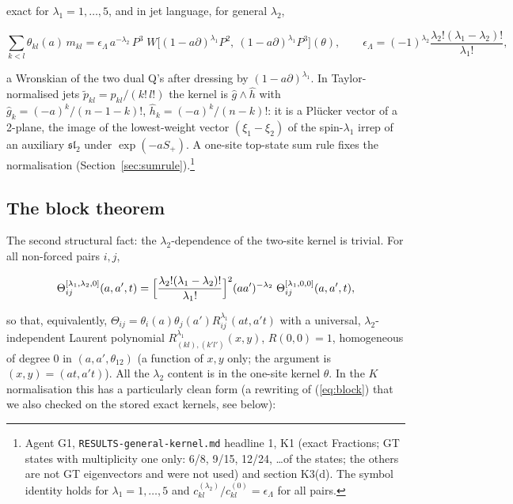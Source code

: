 \documentclass[11pt]{article}
\begin{document}
exact for $\lambda_1=1,\dots,5$, and in jet language, for general $\lambda_2$,

\begin{equation}
\sum_{k<l}\theta_{kl}(a)\,m_{kl}=\epsilon_\Lambda\,a^{-\lambda_2}\,P^3\;W\bigl[(1-a\partial)^{\lambda_1}P^2,\ (1-a\partial)^{\lambda_1}P^3\bigr](\theta),\qquad \epsilon_\Lambda=(-1)^{\lambda_2}\frac{\lambda_2!(\lambda_1-\lambda_2)!}{\lambda_1!},\label{eq:dressedW}
\end{equation}

a Wronskian of the two dual Q's after dressing by $(1-a\partial)^{\lambda_1}$. In Taylor-normalised jets $\tilde p_{kl}=p_{kl}/(k!\,l!)$ the kernel is $\hat g\wedge\hat h$ with $\hat g_k=(-a)^k/(n-1-k)!$, $\hat h_k=(-a)^k/(n-k)!$: it is a Plücker vector of a 2-plane, the image of the lowest-weight vector $(\xi_1-\xi_2)$ of the spin-$\lambda_1$ irrep of an auxiliary $\mathfrak{sl}_2$ under $\exp(-aS_+)$. A one-site top-state sum rule fixes the normalisation (Section~\ref{sec:sumrule}).\footnote{Agent G1, \texttt{RESULTS-\allowbreak{}general-\allowbreak{}kernel.\allowbreak{}md} headline 1, K1 (exact Fractions; GT states with multiplicity one only: 6/8, 9/15, 12/24, \dots of the states; the others are not GT eigenvectors and were not used) and section K3(d).
The symbol identity holds for $\lambda_1=1,\dots,5$ and $c^{(\lambda_2)}_{kl}/c^{(0)}_{kl}=\epsilon_\Lambda$ for all pairs.}

\subsection{The block theorem}\label{sec:block}

The second structural fact: the $\lambda_2$-dependence of the two-site kernel is trivial.
For all non-forced pairs $i,j$,

\begin{equation}
\Theta^{[\lambda_1,\lambda_2,0]}_{ij}(a,a',t)=\Bigl[\frac{\lambda_2!(\lambda_1-\lambda_2)!}{\lambda_1!}\Bigr]^2(aa')^{-\lambda_2}\;\Theta^{[\lambda_1,0,0]}_{ij}(a,a',t),\label{eq:block}
\end{equation}

so that, equivalently, $\Theta_{ij}=\theta_i(a)\theta_j(a')R^{\lambda_1}_{ij}(at,a't)$ with a universal, $\lambda_2$-independent Laurent polynomial $R^{\lambda_1}_{(kl),(k'l')}(x,y)$, $R(0,0)=1$, homogeneous of degree $0$ in $(a,a',\theta_{12})$ (a function of $x,y$ only; the argument is $(x,y)=(at,a't)$).
All the $\lambda_2$ content is in the one-site kernel $\theta$. In the $K$ normalisation this has a particularly clean form (a rewriting of (\ref{eq:block}) that we also checked on the stored exact kernels, see below):
\end{document}
